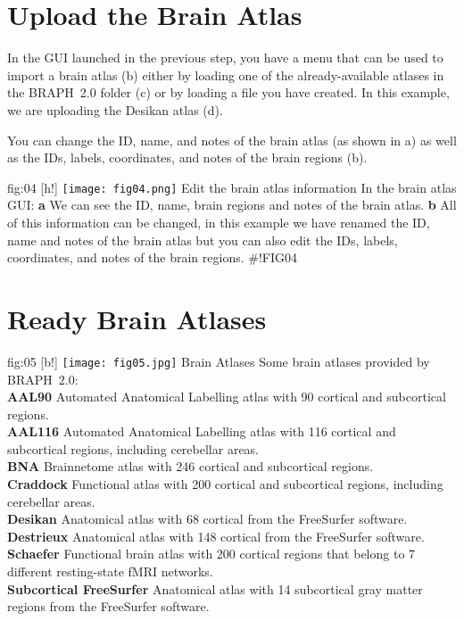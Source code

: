\documentclass[justified]{tufte-handout}
\begin{document}
\clearpage
\section{Upload the Brain Atlas}

In the GUI launched in the previous step, you have a menu that can be used to import a brain atlas (b) either by loading one of the already-available atlases in the BRAPH~2.0 folder  (c) or by loading a file you have created. In this example, we are uploading the Desikan atlas (d).

You can change the ID, name, and notes of the brain atlas (as shown in a) as well as the IDs, labels, coordinates, and notes of the brain regions (b).
	
	{fig:04}
	{
	[h!]
	\texttt{[image: fig04.png]}
	}
	{Edit the brain atlas information}
	{
	In the brain atlas GUI: 
	{\bf a} We can see the ID, name, brain regions and notes of the brain atlas.
	{\bf b} All of this information can be changed, in this example we have renamed the ID, name and notes of the brain atlas but you can also edit the IDs, labels, coordinates, and notes of the brain regions.
	}
#!FIG04

\section{Ready Brain Atlases}

	{fig:05}
	{
	[b!]
	\texttt{[image: fig05.jpg]}
	}
	{Brain Atlases}
	{
	Some brain atlases provided by BRAPH~2.0: \\
	{\bf AAL90} Automated Anatomical Labelling atlas with 90 cortical and subcortical regions.\\
	{\bf AAL116} Automated Anatomical Labelling atlas with 116 cortical and subcortical regions, including cerebellar areas.\\
	{\bf BNA} Brainnetome atlas with 246 cortical and subcortical regions.\\
	{\bf Craddock} Functional atlas with 200 cortical and subcortical regions, including cerebellar areas.\\
	{\bf Desikan} Anatomical atlas with 68 cortical from the FreeSurfer software.\\
	{\bf Destrieux} Anatomical atlas with 148 cortical from the FreeSurfer software.\\
	{\bf Schaefer} Functional brain atlas with 200 cortical regions that belong to 7 different resting-state fMRI networks.\\
	{\bf Subcortical FreeSurfer} Anatomical atlas with 14 subcortical gray matter regions from the FreeSurfer software.
	}
\end{document}
